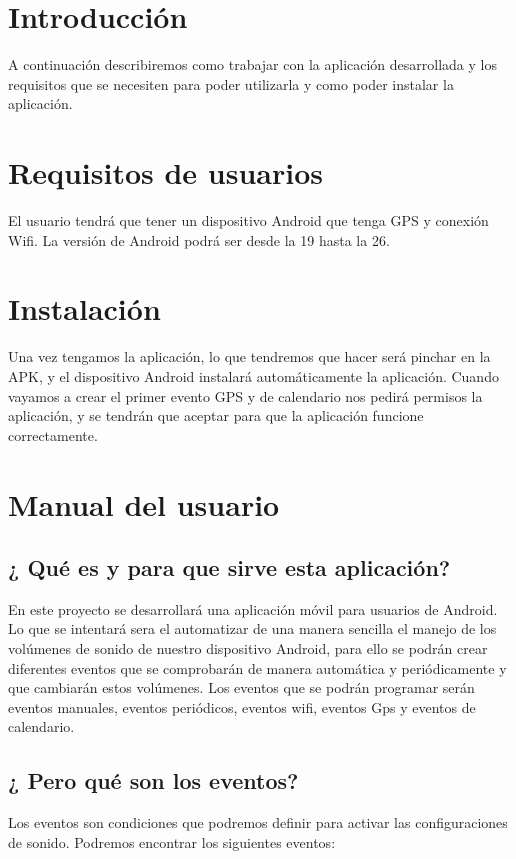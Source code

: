 
\section{Introducción}

A continuación describiremos como trabajar con la aplicación desarrollada y los requisitos que se necesiten para poder utilizarla y como poder instalar la aplicación.
\section{Requisitos de usuarios}
El usuario tendrá que tener un dispositivo Android que tenga GPS y conexión Wifi. La versión de Android podrá ser desde la 19 hasta la 26.

\section{Instalación}

Una vez tengamos la aplicación, lo que tendremos que hacer será pinchar en la APK, y el dispositivo Android instalará automáticamente la aplicación. Cuando vayamos a crear el primer evento GPS y de calendario nos pedirá permisos la aplicación, y se tendrán que aceptar para que la aplicación funcione correctamente.

\section{Manual del usuario}

\subsection{¿ Qué es y para que sirve esta aplicación?}
En este proyecto se desarrollará una aplicación móvil para usuarios de Android. Lo que se intentará sera el automatizar de una manera sencilla el manejo de los volúmenes de sonido de nuestro dispositivo Android, para ello se podrán crear diferentes eventos que se comprobarán de manera automática y periódicamente y que cambiarán estos volúmenes.
Los eventos que se podrán programar serán eventos manuales, eventos periódicos, eventos wifi, eventos Gps y eventos de calendario.
\subsection{¿ Pero qué son los eventos?}
Los eventos son condiciones que podremos definir para activar las configuraciones de sonido.
Podremos encontrar los siguientes eventos:
